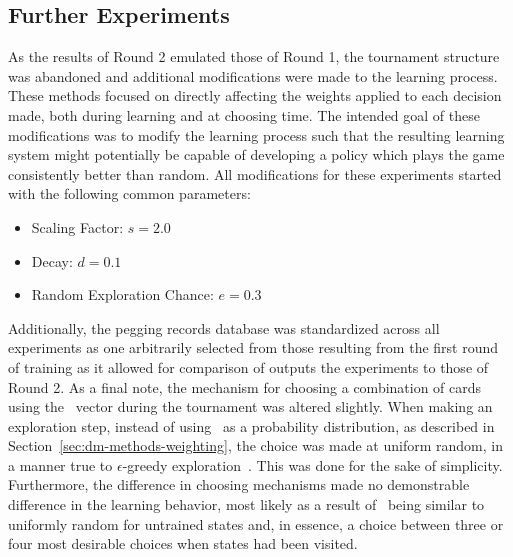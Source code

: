 

\subsection{Further Experiments}
\label{sec:findings-expts}

As the results of Round 2 emulated those of Round 1,
the tournament structure was abandoned and
additional modifications were made to the learning process.
%
These methods focused on directly affecting the weights applied to each
decision made,
both during learning and at choosing time.
%
The intended goal of these modifications was to modify the learning process
such that the resulting learning system might potentially be
capable of developing a policy which plays the game consistently better than
random.
%
All modifications for these experiments started with the following common
parameters:
\begin{itemize}
	\item Scaling Factor: $s = 2.0$
	\item Decay: $d = 0.1$
	\item Random Exploration Chance: $e = 0.3$
\end{itemize}
%
Additionally,
the pegging records database was standardized across all experiments
as one arbitrarily selected from those resulting from the first round of
training
as it allowed for comparison of outputs the experiments to those of Round 2.
%
As a final note,
the mechanism for choosing a combination of cards using the \pvec\ vector 
during the tournament was altered slightly.
%
When making an exploration step,
instead of using \pvec\ as a probability distribution,
as described in Section~\ref{sec:dm-methods-weighting},
the choice was made at uniform random,
in a manner true to $\epsilon$-greedy exploration~\cite{rl_book}.
%
This was done for the sake of simplicity.
%
Furthermore,
the difference in choosing mechanisms
made no demonstrable difference in the learning behavior,
most likely as a result of \pvec\ being similar to uniformly random
for untrained states
and, in essence, a choice between three or four most desirable choices when
states had been visited.

%












